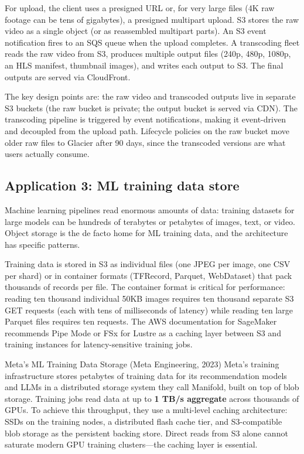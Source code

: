 \documentclass[11pt,a4paper]{article}
\begin{document}
For upload, the client uses a presigned URL or, for very large files (4K raw footage can be tens of gigabytes), a presigned multipart upload. S3 stores the raw video as a single object (or as reassembled multipart parts). An S3 event notification fires to an SQS queue when the upload completes. A transcoding fleet reads the raw video from S3, produces multiple output files (240p, 480p, 1080p, an HLS manifest, thumbnail images), and writes each output to S3. The final outputs are served via CloudFront.

The key design points are: the raw video and transcoded outputs live in separate S3 buckets (the raw bucket is private; the output bucket is served via CDN). The transcoding pipeline is triggered by event notifications, making it event-driven and decoupled from the upload path. Lifecycle policies on the raw bucket move older raw files to Glacier after 90 days, since the transcoded versions are what users actually consume.

\subsection{Application 3: ML training data store}

Machine learning pipelines read enormous amounts of data: training datasets for large models can be hundreds of terabytes or petabytes of images, text, or video. Object storage is the de facto home for ML training data, and the architecture has specific patterns.

Training data is stored in S3 as individual files (one JPEG per image, one CSV per shard) or in container formats (TFRecord, Parquet, WebDataset) that pack thousands of records per file. The container format is critical for performance: reading ten thousand individual 50KB images requires ten thousand separate S3 GET requests (each with tens of milliseconds of latency) while reading ten large Parquet files requires ten requests. The AWS documentation for SageMaker recommends Pipe Mode or FSx for Lustre as a caching layer between S3 and training instances for latency-sensitive training jobs.

\begin{industrybox}{Meta's ML Training Data Storage (Meta Engineering, 2023)}
Meta's training infrastructure stores petabytes of training data for its recommendation models and LLMs in a distributed storage system they call Manifold, built on top of blob storage. Training jobs read data at up to \textbf{1 TB/s aggregate} across thousands of GPUs. To achieve this throughput, they use a multi-level caching architecture: SSDs on the training nodes, a distributed flash cache tier, and S3-compatible blob storage as the persistent backing store. Direct reads from S3 alone cannot saturate modern GPU training clusters---the caching layer is essential.
\end{industrybox}
\end{document}

